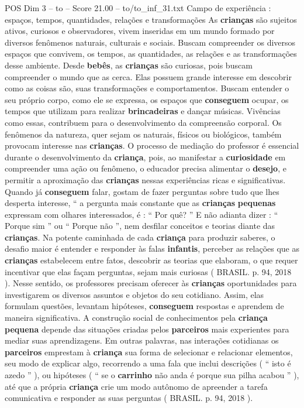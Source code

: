 \begin{textsample}{POS Dim 3 – to – Score 21.00 – to/to\_inf\_31.txt}  \label{ex:f3_pos_110}
Campo de experiência : espaços, tempos, quantidades, relações e transformações As \textbf{crianças} são sujeitos ativos, curiosos e observadores, vivem inseridas em um mundo formado por diversos fenômenos naturais, culturais e sociais.
Buscam compreender os diversos espaços que convivem, os tempos, as quantidades, as relações e as transformações desse ambiente.
Desde \textbf{bebês}, as \textbf{crianças} são curiosas, pois buscam compreender o mundo que as cerca.
Elas possuem grande interesse em descobrir como as coisas são, suas transformações e comportamentos.
Buscam entender o seu próprio corpo, como ele se expressa, os espaços que \textbf{conseguem} ocupar, os tempos que utilizam para realizar \textbf{brincadeiras} e dançar músicas.
Vivências como essas, contribuem para o desenvolvimento da compreensão corporal.
Os fenômenos da natureza, quer sejam os naturais, físicos ou biológicos, também provocam interesse nas \textbf{crianças}.
O processo de mediação do professor é essencial durante o desenvolvimento da \textbf{criança}, pois, ao manifestar a \textbf{curiosidade} em compreender uma ação ou fenômeno, o educador precisa alimentar o \textbf{desejo}, e permitir a aproximação das \textbf{crianças} nessas experiências ricas e significativas.
Quando já \textbf{conseguem} falar, gostam de fazer perguntas sobre tudo que lhes desperta interesse, “ a pergunta mais constante que as \textbf{crianças} \textbf{pequenas} expressam com olhares interessados, é : “ Por quê? ” E não adianta dizer : “ Porque sim ” ou “ Porque não ”, nem desfilar conceitos e teorias diante das \textbf{crianças}.
Na potente caminhada de cada \textbf{criança} para produzir saberes, o desafio maior é entender e responder às falas \textbf{infantis}, perceber as relações que as \textbf{crianças} estabelecem entre fatos, descobrir as teorias que elaboram, o que requer incentivar que elas façam perguntas, sejam mais curiosas ( BRASIL. p. 94, 2018 ).
Nesse sentido, os professores precisam oferecer às \textbf{crianças} oportunidades para investigarem os diversos assuntos e objetos do seu cotidiano.
Assim, elas formulam questões, levantam hipóteses, \textbf{conseguem} respostas e aprendem de maneira significativa.
A construção social de conhecimentos pela \textbf{criança} \textbf{pequena} depende das situações criadas pelos \textbf{parceiros} mais experientes para mediar suas aprendizagens.
Em outras palavras, nas interações cotidianas os \textbf{parceiros} emprestam à \textbf{criança} sua forma de selecionar e relacionar elementos, seu modo de explicar algo, recorrendo a uma fala que inclui descrições ( “ isto é azedo ” ), ou hipóteses ( “ se o \textbf{carrinho} não anda é porque sua pilha acabou ” ), até que a própria \textbf{criança} crie um modo autônomo de apreender a tarefa comunicativa e responder as suas perguntas ( BRASIL. p. 94, 2018 ).

\end{textsample}
